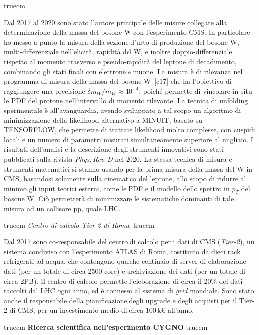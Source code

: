\documentclass[11pt,twoside,a4paper]{article}
\begin{document}
 truecm

Dal 2017 al 2020 sono stato l'autore principale delle misure collegate
alla determinazione della massa del bosone W con l'esperimento CMS. In
particolare ho messo a punto la misura della sezione d'urto di
produzione del bosone W, multi-differenziale nell'elicit\`a,
rapidit\`a del W, e inoltre doppio-differenziale rispetto al momento
trasverso e pseudo-rapidit\`a del leptone di decadimento, combinando
gli stati finali con elettrone e muone. La misura \`e di rilevanza nel
programma di misura della massa del bosone W~[c17] che ha l'obiettivo
di raggiungere una precisione $\delta m_W/m_W\approx 10^{-4}$,
poich\'e permette di vincolare in-situ le PDF del protone
nell'intervallo di momento rilevante. La tecnica di unfolding
sperimentale \`e all'avanguardia, avendo sviluppato a tal scopo un
algoritmo di minimizzazione della likelihood alternativo a
\textsc{MINUIT}, basato su \textsc{TENSORFLOW}, che permette di
trattare likelihood molto complesse, con cuspidi locali e un numero di
parametri misurati simultaneamente superiore al migliaio. I risultati
dell'analisi e la descrizione degli strumenti innovativi sono stati
pubblicati sulla rivista \textit{Phys.\,Rev.\,D} nel 2020. La stessa
tecnica di misura e strumenti matematici si stanno usando per la prima
misura della massa del W in CMS, basandosi solamente sulla cinematica
del leptone, allo scopo di ridurre al minimo gli input teorici
esterni, come le PDF e il modello dello spettro in $p_T$ del bosone W.
Ci\`o permetter\`a di minimizzare le sistematiche dominanti di tale
misura ad un collisore pp, quale LHC.

 truecm
\textit{Centro di calcolo Tier-2 di Roma.}
 truecm

Dal 2017 sono co-responsabile del centro di calcolo per i dati di CMS
(\textit{Tier-2}), un sistema condiviso con l'esperimento ATLAS di
Roma, costituito da dieci rack refrigerati ad acqua, che contengono
qualche centinaio di server di elaborazione dati (per un totale di
circa 2500 core) e archiviazione dei dati (per un totale di circa
2PB). Il centro di calcolo permette l'eleborazione di circa il 20\%
dei dati raccolti dal LHC ogni anno, ed \`e connesso al sistema di
\textit{grid} mondiale. Sono stato anche il responsabile della
pianificazione degli upgrade e degli acquisti per il Tier-2 di CMS,
per un investimento medio di circa 100\,k\euro{} all'anno.


 truecm
{\bf{Ricerca scientifica nell'esperimento CYGNO}}
 truecm
\end{document}
